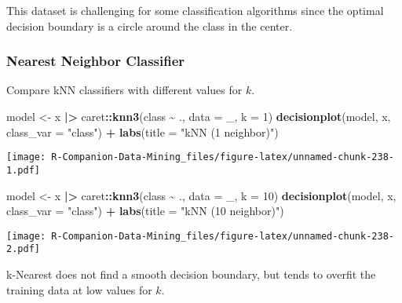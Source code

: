 \documentclass[
  notitlepage]{book}
\newenvironment{Shaded}{\begin{snugshade}}{\end{snugshade}}
\newcommand{\DataTypeTok}[1]{\textcolor[rgb]{0.13,0.29,0.53}{#1}}
\newcommand{\DecValTok}[1]{\textcolor[rgb]{0.00,0.00,0.81}{#1}}
\newcommand{\ErrorTok}[1]{\textcolor[rgb]{0.64,0.00,0.00}{\textbf{#1}}}
\newcommand{\KeywordTok}[1]{\textcolor[rgb]{0.13,0.29,0.53}{\textbf{#1}}}
\newcommand{\NormalTok}[1]{#1}
\newcommand{\OperatorTok}[1]{\textcolor[rgb]{0.81,0.36,0.00}{\textbf{#1}}}
\newcommand{\StringTok}[1]{\textcolor[rgb]{0.31,0.60,0.02}{#1}}
\begin{document}
This dataset is challenging for some classification algorithms since
the optimal decision boundary is a circle around the class in the center.

\hypertarget{nearest-neighbor-classifier-2}{%
\subsubsection{Nearest Neighbor Classifier}\label{nearest-neighbor-classifier-2}}

Compare kNN classifiers with different values for \(k\).

\begin{Shaded}
\begin{Highlighting}[]
\NormalTok{model \textless{}{-}}\StringTok{ }\NormalTok{x }\OperatorTok{|}\ErrorTok{\textgreater{}}\StringTok{ }\NormalTok{caret}\OperatorTok{::}\KeywordTok{knn3}\NormalTok{(class }\OperatorTok{\textasciitilde{}}\StringTok{ }\NormalTok{., }\DataTypeTok{data =}\NormalTok{ \_, }\DataTypeTok{k =} \DecValTok{1}\NormalTok{)}
\KeywordTok{decisionplot}\NormalTok{(model, x, }\DataTypeTok{class\_var =} \StringTok{"class"}\NormalTok{) }\OperatorTok{+}\StringTok{ }
\StringTok{  }\KeywordTok{labs}\NormalTok{(}\DataTypeTok{title =} \StringTok{"kNN (1 neighbor)"}\NormalTok{)}
\end{Highlighting}
\end{Shaded}

\texttt{[image: R-Companion-Data-Mining\_files/figure-latex/unnamed-chunk-238-1.pdf]}

\begin{Shaded}
\begin{Highlighting}[]
\NormalTok{model \textless{}{-}}\StringTok{ }\NormalTok{x }\OperatorTok{|}\ErrorTok{\textgreater{}}\StringTok{ }\NormalTok{caret}\OperatorTok{::}\KeywordTok{knn3}\NormalTok{(class }\OperatorTok{\textasciitilde{}}\StringTok{ }\NormalTok{., }\DataTypeTok{data =}\NormalTok{ \_, }\DataTypeTok{k =} \DecValTok{10}\NormalTok{)}
\KeywordTok{decisionplot}\NormalTok{(model, x, }\DataTypeTok{class\_var =} \StringTok{"class"}\NormalTok{) }\OperatorTok{+}\StringTok{ }
\StringTok{  }\KeywordTok{labs}\NormalTok{(}\DataTypeTok{title =} \StringTok{"kNN (10 neighbor)"}\NormalTok{)}
\end{Highlighting}
\end{Shaded}

\texttt{[image: R-Companion-Data-Mining\_files/figure-latex/unnamed-chunk-238-2.pdf]}

k-Nearest does not find a smooth decision boundary, but tends to
overfit the training data at low values for \(k\).
\end{document}
